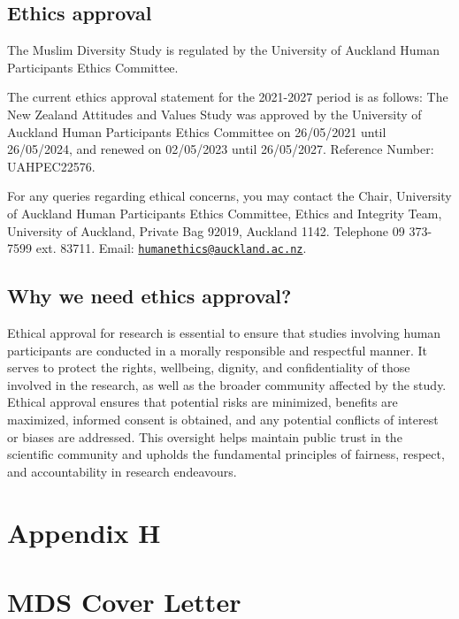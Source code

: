 \documentclass[
]{interact}
\begin{document}
\subsection{Ethics approval}\label{ethics-approval}

\noindent The Muslim Diversity Study is regulated by the University of
Auckland Human Participants Ethics Committee.

\noindent The current ethics approval statement for the 2021-2027 period
is as follows: The New Zealand Attitudes and Values Study was approved
by the University of Auckland Human Participants Ethics Committee on
26/05/2021 until 26/05/2024, and renewed on 02/05/2023 until 26/05/2027.
Reference Number: UAHPEC22576.

\noindent For any queries regarding ethical concerns, you may contact
the Chair, University of Auckland Human Participants Ethics Committee,
Ethics and Integrity Team, University of Auckland, Private Bag 92019,
Auckland 1142. Telephone 09 373-7599 ext. 83711. Email:
\href{mailto:humanethics@auckland.ac.nz}{\nolinkurl{humanethics@auckland.ac.nz}}.

\subsection{Why we need ethics
approval?}\label{why-we-need-ethics-approval}

\noindent Ethical approval for research is essential to ensure that
studies involving human participants are conducted in a morally
responsible and respectful manner. It serves to protect the rights,
wellbeing, dignity, and confidentiality of those involved in the
research, as well as the broader community affected by the study.
Ethical approval ensures that potential risks are minimized, benefits
are maximized, informed consent is obtained, and any potential conflicts
of interest or biases are addressed. This oversight helps maintain
public trust in the scientific community and upholds the fundamental
principles of fairness, respect, and accountability in research
endeavours.

\newpage{}

\section{Appendix H}\label{appendix-h}

\section{MDS Cover Letter}\label{mds-cover-letter}
\end{document}
